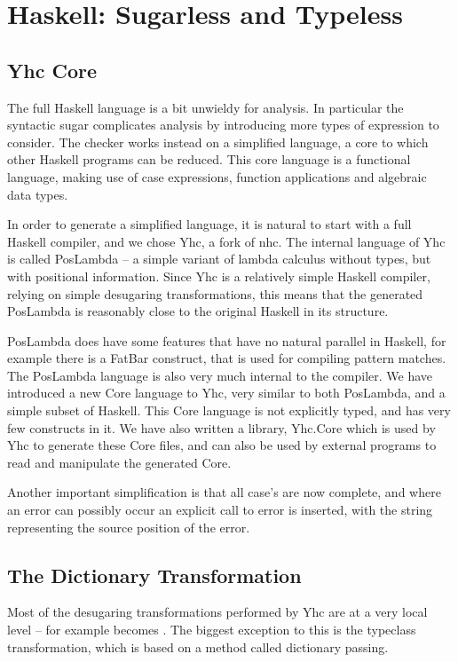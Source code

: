 \documentclass[preprint]{sigplanconf}
\begin{document}
\section{Haskell: Sugarless and Typeless}
\label{chap:yhc}

\subsection{Yhc Core}

The full Haskell language is a bit unwieldy for analysis. In particular the
syntactic sugar complicates analysis by introducing more types of expression to
consider. The checker works instead on a simplified language, a core to which
other Haskell programs can be reduced. This core language is a functional
language, making use of case expressions, function applications and algebraic
data types.

In order to generate a simplified language, it is natural to start with a full
Haskell compiler, and we chose Yhc, a fork of nhc. The internal language of Yhc
is called PosLambda -- a simple variant of lambda calculus without types, but
with positional information. Since Yhc is a relatively simple Haskell compiler,
relying on simple desugaring transformations, this means that the generated
PosLambda is reasonably close to the original Haskell in its structure.

PosLambda does have some features that have no natural parallel in Haskell, for
example there is a FatBar construct, that is used for compiling pattern
matches. The PosLambda language is also very much internal to the compiler. We
have introduced a new Core language to Yhc, very similar to both PosLambda, and
a simple subset of Haskell. This Core language is not explicitly typed, and has
very few constructs in it. We have also written a library, Yhc.Core which is
used by Yhc to generate these Core files, and can also be used by external
programs to read and manipulate the generated Core.

Another important simplification is that all case's are now complete, and where
an error can possibly occur an explicit call to error is inserted, with the
string representing the source position of the error.

\subsection{The Dictionary Transformation}

Most of the desugaring transformations performed by Yhc are at a very local
level -- for example  becomes . The biggest exception to this is the typeclass transformation, which is
based on a method called dictionary passing.
\end{document}
